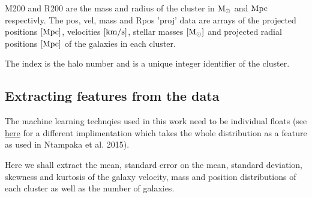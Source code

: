 \documentclass[11pt]{article}
\begin{document}
    M200 and R200 are the mass and radius of the cluster in \(\rm M_\odot\)
and \(\rm Mpc\) respectivly. The pos, vel, mass and Rpos 'proj' data are
arrays of the projected positions \(\rm [Mpc]\), velocities
\(\rm [km/s]\), stellar masses \(\rm [M_\odot]\) and projected radial
positions \(\rm [Mpc]\) of the galaxies in each cluster.

The index is the halo number and is a unique integer identifier of the
cluster.

    \subsection{Extracting features from the
data}\label{extracting-features-from-the-data}

The machine learning technqies used in this work need to be individual
floats (see
\href{https://dougalsutherland.github.io/skl-groups/index.html}{here}
for a different implimentation which takes the whole distribution as a
feature as used in Ntampaka et al. 2015).

Here we shall extract the mean, standard error on the mean, standard
deviation, skewness and kurtosis of the galaxy velocity, mass and
position distributions of each cluster as well as the number of
galaxies.
\end{document}
